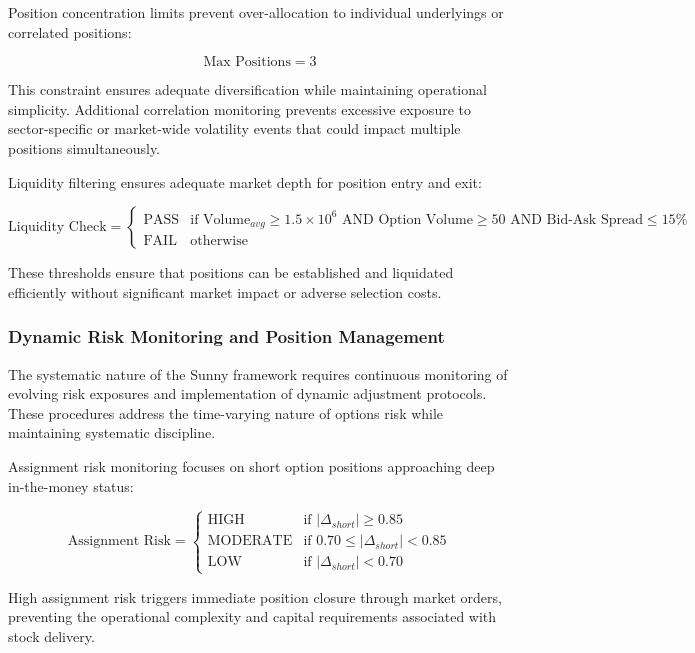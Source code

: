\documentclass[
  american,
  11pt,
  11pt,
  letterpaper,
  onecolumn]{article}
\begin{document}
Position concentration limits prevent over-allocation to individual
underlyings or correlated positions:

\[\text{Max Positions} = 3\]

This constraint ensures adequate diversification while maintaining
operational simplicity. Additional correlation monitoring prevents
excessive exposure to sector-specific or market-wide volatility events
that could impact multiple positions simultaneously.

Liquidity filtering ensures adequate market depth for position entry and
exit:

\[\text{Liquidity Check} = \begin{cases}
\text{PASS} & \text{if } \text{Volume}_{avg} \geq 1.5 \times 10^6 \text{ AND } \text{Option Volume} \geq 50 \text{ AND } \text{Bid-Ask Spread} \leq 15\% \\
\text{FAIL} & \text{otherwise}
\end{cases}\]

These thresholds ensure that positions can be established and liquidated
efficiently without significant market impact or adverse selection
costs.

\subsubsection{Dynamic Risk Monitoring and Position
Management}\label{dynamic-risk-monitoring-and-position-management}

The systematic nature of the Sunny framework requires continuous
monitoring of evolving risk exposures and implementation of dynamic
adjustment protocols. These procedures address the time-varying nature
of options risk while maintaining systematic discipline.

Assignment risk monitoring focuses on short option positions approaching
deep in-the-money status:

\[\text{Assignment Risk} = \begin{cases}
\text{HIGH} & \text{if } |\Delta_{short}| \geq 0.85 \\
\text{MODERATE} & \text{if } 0.70 \leq |\Delta_{short}| < 0.85 \\
\text{LOW} & \text{if } |\Delta_{short}| < 0.70
\end{cases}\]

High assignment risk triggers immediate position closure through market
orders, preventing the operational complexity and capital requirements
associated with stock delivery.
\end{document}
